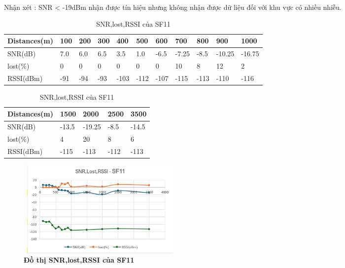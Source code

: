 \documentclass{article} %
\begin{document}
	
	Nhận xét : SNR < -19dBm nhận được tín hiệu nhưng không nhận được dữ liệu đối với khu vực có nhiều nhiễu.
	
	
	\begin{table}[H]
		\centering
		\begin{tabular}{|l|l|l|l|l|l|l|l|l|l|l|}
			\hline
			\textbf{Distances(m)} & \textbf{100} & \textbf{200} & \textbf{300} & \textbf{400} & \textbf{500} & \textbf{600} & \textbf{700} & \textbf{800} & \textbf{900} & \textbf{1000} \\ \hline
			SNR(dB)       & 7.0          & 6.0          & 6.5          & 3.5          & 1.0          & -6.5         & -7.25        & -8.5         & -10.25       & -16.75        \\ \hline
			lost(\%)      & 0         & 0         & 0         & 0         & 0         & 0         & 10         & 8         & 12         & 2          \\ \hline
			RSSI(dBm)     & -91          & -94          & -93          & -103         & -112         & -107         & -115         & -113         & -110         & -116          \\ \hline
		\end{tabular}
		\caption{SNR,lost,RSSI của SF11  }
		\label{SF11}
	\end{table}
	
	\begin{table}[H]
		\centering
		\begin{tabular}{|l|l|l|l|l|}
			\hline
			\textbf{Distances(m)} & \textbf{1500} & \textbf{2000} & \textbf{2500} & \textbf{3500} \\ \hline
			SNR(dB)       & -13.5         & -19.25        & -8.5          & -14.5         \\ \hline
			lost(\%)      & 4          & 20          & 8          & 6          \\ \hline
			RSSI(dBm)     & -115          & -113          & -112          & -113          \\ \hline
		\end{tabular}
		\caption{SNR,lost,RSSI của SF11  }
		\label{SF11_2}
	\end{table}
	
	\begin{figure}[!ht]
		\centering
		\includegraphics[width=8.2cm,height=4.7cm]{Images/sf11.png}
		\caption[ Đồ thị SNR,lost,RSSI của SF11 ]{\bfseries \fontsize{12pt}{0pt}\selectfont  Đồ thị SNR,lost,RSSI của SF11}
		\label{sf11}
	\end{figure}
	
\end{document}
